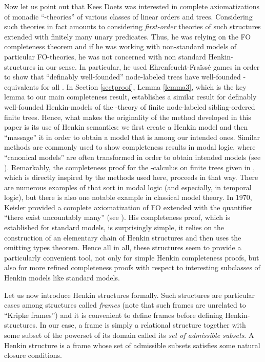 \documentclass{LMCS}
\newcommand{\fo}{\textsf{FO}\xspace}
\begin{document}
Now let us point out that Kees Doets was interested in complete axiomatizations of monadic ``-theories'' of various classes of
linear orders and trees. Considering such theories in fact amounts to considering \emph{first-order} theories of such structures extended with finitely many unary predicates. Thus, he was relying on the \fo completeness theorem and if he was working with non-standard models of particular \fo-theories, he was not concerned with non standard Henkin-structures in our sense. In particular, he used Ehrenfeucht-Fra\"{i}ss\'{e} games in order to show that ``definably well-founded'' node-labeled trees have well-founded -equivalents for all . 
In Section \ref{sectproof}, Lemma \ref{lemma3}, which is the key lemma to our main completeness result, establishes a similar result for definably well-founded Henkin-models of the -theory of finite node-labeled sibling-ordered finite trees. Hence, what makes the originality of the method developed in this paper is its use of Henkin semantics: we first create a Henkin model and then ``massage'' it in order to obtain a model that is among our intended ones. Similar methods are commonly used to show completeness results in modal logic, where ``canonical models'' are often transformed in order to obtain intended models (see \cite{modal}). Remarkably, the completeness proof for the -calculus on finite trees given in \cite{DBLP:conf/fossacs/CateF10}, which is directly inspired by the methods used here, proceeds in that way. There are numerous examples of that sort in modal logic (and especially, in temporal logic), but there is also one notable example in classical model theory. In 
1970, Keisler provided a complete axiomatization of \fo extended with the quantifier ``there exist uncountably many'' (see \cite{keisler}). His completeness proof, which is established for standard models, is surprisingly simple, it relies on the construction of an elementary chain of Henkin structures and then uses the omitting types theorem. Hence all in all, these structures seem to provide a particularly convenient tool, not only for simple Henkin completeness proofs, but also for more refined completeness proofs with respect to interesting subclasses of Henkin models like standard models. 

Let us now introduce Henkin structures formally. Such structures are
particular cases among structures called \emph{frames} (note that such frames are unrelated to ``Kripke frames'') and it is convenient to define frames before defining Henkin-structures. In our case, a frame is simply a relational structure together with some subset of the powerset of its domain called its \emph{set of admissible subsets}. A Henkin structure is a frame whose set of admissible subsets satisfies some natural closure conditions.
\end{document}
